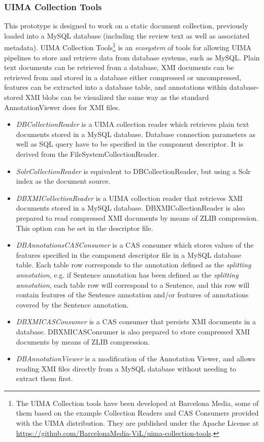 \documentclass{llncs}
\begin{document}
\subsubsection{UIMA Collection Tools}

This prototype is designed to work on a static document collection, previously loaded into a MySQL database (including the review text as well as associated metadata). 
 UIMA Collection Tools\footnote{The UIMA Collection tools have been developed at Barcelona Media, some of them based on the example Collection Readers and CAS Consumers provided with the UIMA distribution. They are published under the Apache License at \url{https://github.com/BarcelonaMedia-ViL/uima-collection-tools}.} is an \emph{ecosystem} of tools for allowing UIMA pipelines to store and retrieve data from database systems, such as MySQL.
Plain text documents can be retrieved from a database, XMI documents can be retrieved from and stored in a database either compressed or uncompressed, features can be extracted into a database table, and annotations within database-stored XMI blobs can be visualized the same way as the standard AnnotationViewer does for XMI files.

\begin{itemize}
\item \emph{DBCollectionReader} is a UIMA collection reader which retrieves plain text documents stored in a MySQL database. Database connection parameters as well as SQL query have to be specified in the component descriptor. It is derived from the FileSystemCollectionReader.

\item \emph{SolrCollectionReader} is equivalent to DBCollectionReader, but using a Solr index as the document source.

\item \emph{DBXMICollectionReader} is a UIMA collection reader that retrieves XMI documents stored in a MySQL database. DBXMICollectionReader is also prepared to read compressed XMI documents by means of ZLIB compression. This option can be set in the descriptor file.

\item \emph{DBAnnotationsCASConsumer} is a CAS consumer which stores values of the features specified in the component descriptor file in a MySQL database table. Each table row corresponds to the annotation defined as the \emph{splitting annotation}, e.g. if Sentence annotation has been defined as the \emph{splitting annotation}, each table row will correspond to a Sentence, and this row will contain features of the Sentence annotation and/or features of annotations covered by the Sentence annotation.

\item \emph{DBXMICASConsumer} is a CAS consumer that persists XMI documents in a database. DBXMICASConsumer is also prepared to store compressed XMI documents by means of ZLIB compression. 

\item \emph{DBAnnotationViewer} is a modification of the Annotation Viewer, and allows reading XMI files directly from a MySQL database without needing to extract them first.
\end{itemize}
\end{document}
